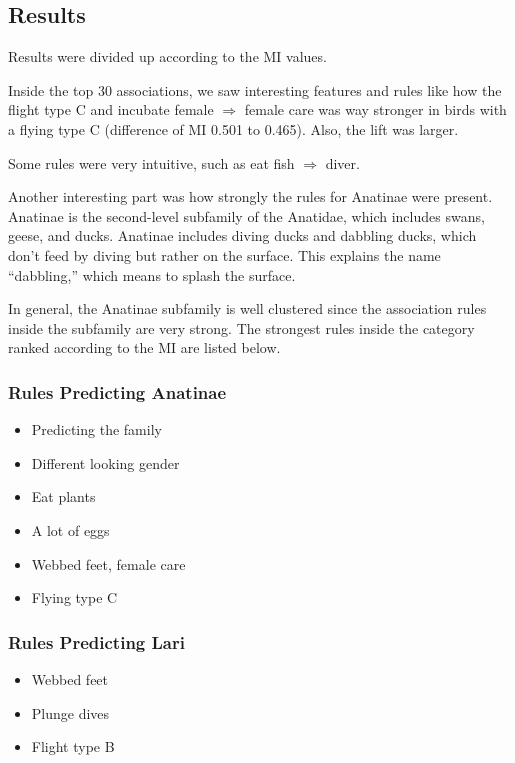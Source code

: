 \subsection{Results}

Results were divided up according to the MI values.

Inside the top 30 associations, we saw interesting features and rules like how the flight type C and incubate female $\Rightarrow$ female care was way stronger in birds with a flying type C (difference of MI 0.501 to 0.465). Also, the lift was larger.

Some rules were very intuitive, such as eat fish $\Rightarrow$ diver.

Another interesting part was how strongly the rules for Anatinae were present. Anatinae is the second-level subfamily of the Anatidae, which includes swans, geese, and ducks. Anatinae includes diving ducks and dabbling ducks, which don't feed by diving but rather on the surface. This explains the name ``dabbling,'' which means to splash the surface.

In general, the Anatinae subfamily is well clustered since the association rules inside the subfamily are very strong. The strongest rules inside the category ranked according to the MI are listed below.

\subsubsection{Rules Predicting Anatinae}
\begin{itemize}
    \item Predicting the family
    \item Different looking gender
    \item Eat plants
    \item A lot of eggs
    \item Webbed feet, female care
    \item Flying type C
\end{itemize}

\subsubsection{Rules Predicting Lari}
\begin{itemize}
    \item Webbed feet
    \item Plunge dives
    \item Flight type B
\end{itemize}

